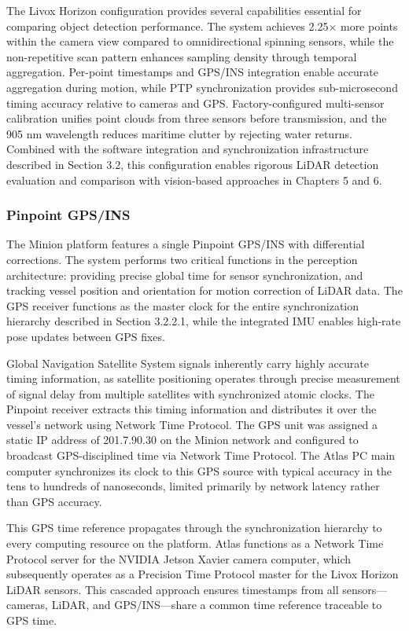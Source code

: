 \documentclass{erauthesis}
\begin{document}
The Livox Horizon configuration provides several capabilities essential for comparing object detection performance.
The system achieves 2.25× more points within the camera view compared to omnidirectional spinning sensors, while the non-repetitive scan pattern enhances sampling density through temporal aggregation.
Per-point timestamps and \ac{GPS}/\ac{INS} integration enable accurate aggregation during motion, while PTP synchronization provides sub-microsecond timing accuracy relative to cameras and \ac{GPS}.
Factory-configured multi-sensor calibration unifies point clouds from three sensors before transmission, and the 905 nm wavelength reduces maritime clutter by rejecting water returns.
Combined with the software integration and synchronization infrastructure described in Section 3.2, this configuration enables rigorous \ac{LiDAR} detection evaluation and comparison with vision-based approaches in Chapters 5 and 6.

            \subsubsection{Pinpoint GPS/INS}

The Minion platform features a single Pinpoint \ac{GPS}/\ac{INS} with differential corrections.
The system performs two critical functions in the perception architecture: providing precise global time for sensor synchronization, and tracking vessel position and orientation for motion correction of \ac{LiDAR} data.
The \ac{GPS} receiver functions as the master clock for the entire synchronization hierarchy described in Section 3.2.2.1, while the integrated \ac{IMU} enables high-rate pose updates between \ac{GPS} fixes.

Global Navigation Satellite System signals inherently carry highly accurate timing information, as satellite positioning operates through precise measurement of signal delay from multiple satellites with synchronized atomic clocks.
The Pinpoint receiver extracts this timing information and distributes it over the vessel's network using Network Time Protocol.
The \ac{GPS} unit was assigned a static IP address of 201.7.90.30 on the Minion network and configured to broadcast \ac{GPS}-disciplined time via Network Time Protocol.
The Atlas PC main computer synchronizes its clock to this \ac{GPS} source with typical accuracy in the tens to hundreds of nanoseconds, limited primarily by network latency rather than \ac{GPS} accuracy.

This \ac{GPS} time reference propagates through the synchronization hierarchy to every computing resource on the platform.
Atlas functions as a Network Time Protocol server for the NVIDIA Jetson Xavier camera computer, which subsequently operates as a Precision Time Protocol master for the Livox Horizon \ac{LiDAR} sensors.
This cascaded approach ensures timestamps from all sensors—cameras, \ac{LiDAR}, and \ac{GPS}/\ac{INS}—share a common time reference traceable to \ac{GPS} time.
\end{document}
